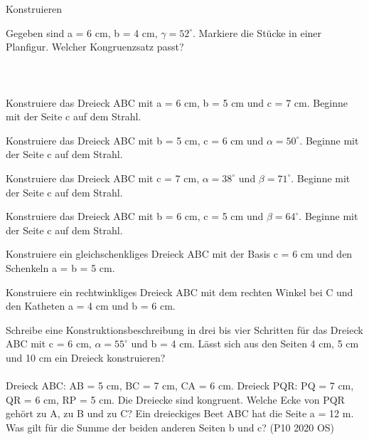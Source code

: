 \setcounter{aufgabe}{19}

\begin{aufgabe}{Konstruieren}
\begin{teile}
\teil Gegeben sind a = 6 cm, b = 4 cm, $\gamma = 52^\circ$. Markiere die Stücke in einer Planfigur. Welcher Kongruenzsatz passt? \\  \\  \\  \\ 
\teil Konstruiere das Dreieck ABC mit a = 6 cm, b = 5 cm und c = 7 cm. Beginne mit der Seite c auf dem Strahl.

\winkelstrahl[9][A]
\teil Konstruiere das Dreieck ABC mit b = 5 cm, c = 6 cm und $\alpha = 50^\circ$. Beginne mit der Seite c auf dem Strahl.

\winkelstrahl[9][A]
\teil Konstruiere das Dreieck ABC mit c = 7 cm, $\alpha = 38^\circ$ und $\beta = 71^\circ$. Beginne mit der Seite c auf dem Strahl.

\winkelstrahl[9][A]
\teil Konstruiere das Dreieck ABC mit b = 6 cm, c = 5 cm und $\beta = 64^\circ$. Beginne mit der Seite c auf dem Strahl.

\winkelstrahl[9][A]
\teil Konstruiere ein gleichschenkliges Dreieck ABC mit der Basis c = 6 cm und den Schenkeln a = b = 5 cm.

\winkelstrahl[9][A]
\teil Konstruiere ein rechtwinkliges Dreieck ABC mit dem rechten Winkel bei C und den Katheten a = 4 cm und b = 6 cm.

\winkelstrahl[9][C]
\teil Schreibe eine Konstruktionsbeschreibung in drei bis vier Schritten für das Dreieck ABC mit c = 6 cm, $\alpha = 55^\circ$ und b = 4 cm.
\teil Lässt sich aus den Seiten 4 cm, 5 cm und 10 cm ein Dreieck konstruieren? \\  \\ 
\teil Dreieck ABC: AB = 5 cm, BC = 7 cm, CA = 6 cm. Dreieck PQR: PQ = 7 cm, QR = 6 cm, RP = 5 cm. Die Dreiecke sind kongruent. Welche Ecke von PQR gehört zu A, zu B und zu C?
\teil Ein dreieckiges Beet ABC hat die Seite a = 12 m. Was gilt für die Summe der beiden anderen Seiten b und c? \hfill (P10 2020 OS) \\  \\  \\ 
\end{teile}
\end{aufgabe}

